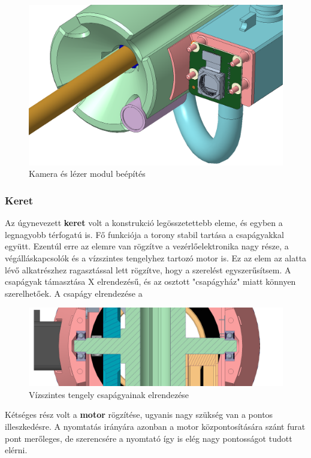 \documentclass[12pt,a4paper]{article}
\begin{document}
\begin{figure}[h!]
	\centering
	\includegraphics[width=1\linewidth]{mech_dt4000kamera}
	\caption{Kamera és lézer modul beépítés}
	\label{fig:mech_dt4000kamera}
\end{figure}

\subsubsection{Keret}
Az úgynevezett \textbf{keret} volt a konstrukció legösszetettebb eleme, és egyben a legnagyobb térfogatú is. Fő funkciója a torony stabil tartása a csapágyakkal együtt. Ezentúl erre az elemre van rögzítve a vezérlőelektronika nagy része, a végálláskapcsolók és a vízszintes tengelyhez tartozó motor is. Ez az elem az alatta lévő alkatrészhez ragasztással lett rögzítve, hogy a szerelést egyszerűsítsem. A csapágyak támasztása X elrendezésű, és az osztott "csapágyház" miatt könnyen szerelhetőek. A csapágy elrendezése  a

\begin{figure}[h!]
	\centering
	\includegraphics[width=1\linewidth]{mech_felsotengely}
	\caption{Vízszintes tengely csapágyainak elrendezése}
	\label{fig:mech_felsotengely}
\end{figure}


Kétséges rész volt a \textbf{motor} rögzítése, ugyanis nagy szükség van a pontos illeszkedésre. A nyomtatás irányára azonban a motor központosítására szánt furat pont merőleges, de szerencsére a nyomtató így is elég nagy pontosságot tudott elérni.
\end{document}
